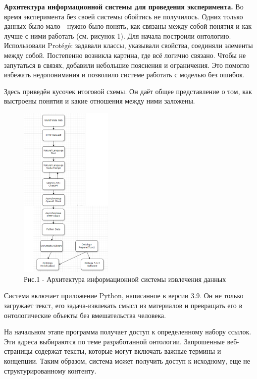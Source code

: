 \begin{multicols}{2}
{\bfseries Архитектура информационной системы для проведения эксперимента.}
Во время эксперимента без своей системы обойтись не получилось. Одних
только данных было мало - нужно было понять, как связаны между собой
понятия и как лучше с ними работать (см. рисунок 1). Для начала
построили онтологию. Использовали Protégé: задавали классы, указывали
свойства, соединяли элементы между собой. Постепенно возникла картина,
где всё логично связано. Чтобы не запутаться в связях, добавили
небольшие пояснения и ограничения. Это помогло избежать недопонимания и
позволило системе работать с моделью без ошибок.

Здесь приведён кусочек итоговой схемы. Он даёт общее представление о
том, как выстроены понятия и какие отношения между ними заложены.

\begin{figure}[H]
	\centering
	\includegraphics[width=0.4\textwidth]{media/ict2/image149}
	\caption*{Рис.1 - Архитектура информационной системы извлечения данных}
\end{figure}

Система включает приложение Python, написанное в версии 3.9. Он не
только загружает текст, его задача-извлекать смысл из материалов и
превращать его в онтологические объекты без вмешательства человека.

На начальном этапе программа получает доступ к определенному набору
ссылок. Эти адреса выбираются по теме разработанной онтологии.
Запрошенные веб-страницы содержат тексты, которые могут включать важные
термины и концепции. Таким образом, система может получить доступ к
исходному, еще не структурированному контенту.


\end{multicols}

